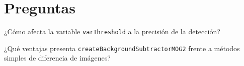 \section*{Preguntas}

\vspace{5mm}
\begin{tcolorbox}[colback=gray!10, colframe=gray!30, coltitle=black, title=Pregunta A.1, halign=left]
¿Cómo afecta la variable \texttt{varThreshold} a la precisión de la detección?
\end{tcolorbox}

\vspace{5mm}
\begin{tcolorbox}[colback=gray!10, colframe=gray!30, coltitle=black, title=Pregunta A.2, halign=left]
¿Qué ventajas presenta \texttt{createBackgroundSubtractorMOG2} frente a métodos simples de diferencia de imágenes?
\end{tcolorbox}